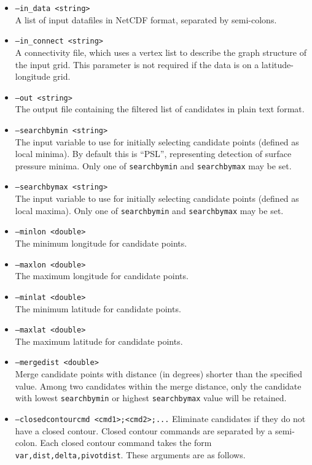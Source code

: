 \documentclass[gmdd, hvmath, online]{copernicus_discussions}
\begin{document}
\begin{itemize}
\item[] \texttt{--in\_data <string>} \\ A list of input datafiles in NetCDF format, separated by semi-colons.
\item[] \texttt{--in\_connect <string>} \\ A connectivity file, which uses a vertex list to describe the graph structure of the input grid.  This parameter is not required if the data is on a latitude-longitude grid.
\item[] \texttt{--out <string>} \\ The output file containing the filtered list of candidates in plain text format.
\item[] \texttt{--searchbymin <string>} \\ The input variable to use for initially selecting candidate points (defined as local minima).  By default this is ``PSL'', representing detection of surface pressure minima.  Only one of \texttt{searchbymin} and \texttt{searchbymax} may be set.
\item[] \texttt{--searchbymax <string>} \\ The input variable to use for initially selecting candidate points (defined as local maxima).  Only one of \texttt{searchbymin} and \texttt{searchbymax} may be set.
\item[] \texttt{--minlon <double>} \\ The minimum longitude for candidate points.
\item[] \texttt{--maxlon <double>} \\ The maximum longitude for candidate points.
\item[] \texttt{--minlat <double>} \\ The minimum latitude for candidate points.
\item[] \texttt{--maxlat <double>} \\ The maximum latitude for candidate points.
\item[] \texttt{--mergedist <double>} \\ Merge candidate points with distance (in degrees) shorter than the specified value.  Among two candidates within the merge distance, only the candidate with lowest \texttt{searchbymin} or highest \texttt{searchbymax} value will be retained. 
\item[] \texttt{--closedcontourcmd <cmd1>;<cmd2>;...} Eliminate candidates if they do not have a closed contour.  Closed contour commands are separated by a semi-colon.  Each closed contour command takes the form \texttt{var,dist,delta,pivotdist}.  These arguments are as follows.

\end{itemize}
\end{document}

